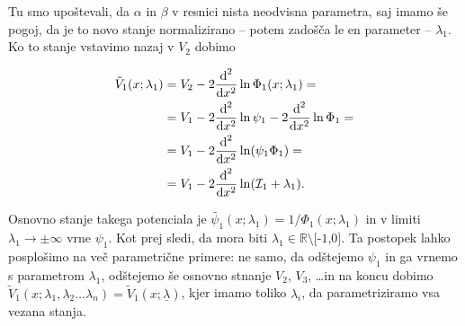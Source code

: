 Tu smo upo\v stevali, da $\alpha$ in $\beta$ v resnici nista neodvisna parametra, saj imamo \v se pogoj, da je to novo stanje
normalizirano -- potem zado\v s\v ca le en parameter -- $\lambda_1$. Ko to stanje vstavimo nazaj v $V_2$ dobimo

\begin{align}
	\tilde{V}_1(x;\lambda_1) &= V_2 - 2\odv[2]\ln\Phi_1(x;\lambda_1) = \notag \\
		&= V_1 - 2\odv[2]\ln\psi_1 - 2\odv[2]\ln\Phi_1 = \notag \\
		&= V_1 - 2\odv[2]\ln (\psi_1 \Phi_1) = \notag \\
		&= V_1 - 2\odv[2]\ln (\mathcal{I}_1 + \lambda_1).
\end{align}

Osnovno stanje takega potenciala je $\tilde{\psi_1}(x;\lambda_1) = 1/\Phi_1 (x;\lambda_1)$ in v limiti $\lambda_1 \to \pm
\infty$ vrne $\psi_1$. Kot prej sledi, da mora biti $\lambda_1 \in \mathbb{R}\text{\textbackslash [-1,0]}$. Ta postopek
lahko posplo\v simo na ve\v c parametri\v cne primere: ne samo, da od\v stejemo $\psi_1$ in ga vrnemo s parametrom $\lambda_1$,
od\v stejemo \v se osnovno stnanje $V_2$, $V_3$, \ldots in na koncu dobimo
$\tilde{V}_1 (x;\lambda_1,\lambda_2\ldots\lambda_n) = \tilde{V}_1 (x; \underline{\lambda})$, kjer imamo toliko $\lambda_i$, da
parametriziramo vsa vezana stanja.

